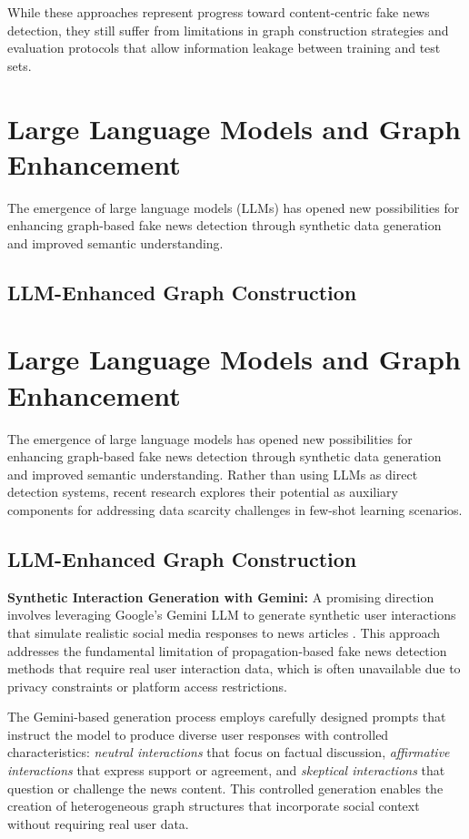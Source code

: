While these approaches represent progress toward content-centric fake news detection, they still suffer from limitations in graph construction strategies and evaluation protocols that allow information leakage between training and test sets.

\section{Large Language Models and Graph Enhancement}

The emergence of large language models (LLMs) has opened new possibilities for enhancing graph-based fake news detection through synthetic data generation and improved semantic understanding.

\subsection{LLM-Enhanced Graph Construction}

\section{Large Language Models and Graph Enhancement}

The emergence of large language models has opened new possibilities for enhancing graph-based fake news detection through synthetic data generation and improved semantic understanding. Rather than using LLMs as direct detection systems, recent research explores their potential as auxiliary components for addressing data scarcity challenges in few-shot learning scenarios.

\subsection{LLM-Enhanced Graph Construction}

\textbf{Synthetic Interaction Generation with Gemini:} A promising direction involves leveraging Google's Gemini LLM to generate synthetic user interactions that simulate realistic social media responses to news articles \cite{yang2023let, zhang2023on}. This approach addresses the fundamental limitation of propagation-based fake news detection methods that require real user interaction data, which is often unavailable due to privacy constraints or platform access restrictions.

The Gemini-based generation process employs carefully designed prompts that instruct the model to produce diverse user responses with controlled characteristics: \emph{neutral interactions} that focus on factual discussion, \emph{affirmative interactions} that express support or agreement, and \emph{skeptical interactions} that question or challenge the news content. This controlled generation enables the creation of heterogeneous graph structures that incorporate social context without requiring real user data.

